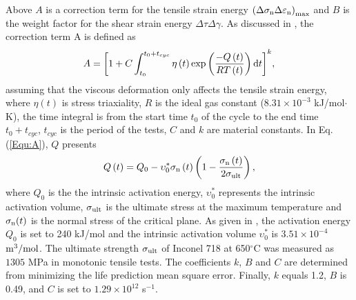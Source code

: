 \documentclass[preprint,5p,twocolumn,11pt,sort&compress]{elsarticle}
\begin{document}
Above $A$ is a correction term for the tensile strain energy ${{\left( {\Delta {\sigma _{\rm n}}\Delta {\varepsilon _{\rm n}}} \right)}_{\max }}$ and $B$ is the weight factor for the shear strain energy ${\Delta \tau \Delta \gamma }$.
As discussed in \cite{Vose2013}, the correction term A is defined as
\begin{equation}
A = {\left[ {1 + C\int_{{t_0}}^{{t_0} + {t_{cyc}}} {\eta \left( t \right)\exp \left( {\frac{{ - Q\left( t \right)}}{{RT\left( t \right)}}} \right){\rm{d}}t} } \right]^k},
\label{Equ:A}
\end{equation}
assuming that the viscous deformation only affects the tensile strain energy, where $\eta \left( t \right)$ is stress triaxiality, $R$ is the ideal gas constant ($8.31\times10^{-3}$ kJ/mol$\cdot$K), the time integral is from the start time $t_0$ of the cycle to the end time $t_0 + t_{cyc}$, $t_{cyc}$ is the period of the tests, $C$ and $k$ are material constants.
In Eq. (\ref{Equ:A}), $Q$ presents \cite{Warren2006,Warren2008}
\begin{equation}
Q\left( t \right) = {Q_0} - \upsilon _0^*{\sigma _{\rm n}}\left( t \right)\left( {1 - \frac{{{\sigma _{\rm n}}\left( t \right)}}{{2{\sigma _{\rm ult}}}}} \right),
\label{Equ:creep_activation_energy}
\end{equation}
where $Q_0$ is the the intrinsic activation energy, $\upsilon _0^*$ represents the intrinsic activation volume, $\sigma_{\rm ult}$ is the ultimate stress at the maximum temperature and $\sigma_{\rm n}(t)$ is the normal stress of the critical plane.
As given in \cite{Warren2008}, the activation energy $Q_0$ is set to 240 kJ/mol and the intrinsic activation volume $\upsilon _0^*$ is $3.51\times10^{-4}$ $\rm{m}^{3}/\rm{mol}$. The ultimate strength $\sigma_{\rm ult}$ of Inconel 718 at 650$^\circ$C was measured as $1305$ MPa in monotonic tensile tests. The coefficients $k$, $B$ and $C$ are determined from minimizing the life prediction mean square error. Finally, $k$ equals 1.2, $B$ is 0.49, and $C$ is set to $1.29\times10^{12}$ s$^{-1}$.



\end{document}
